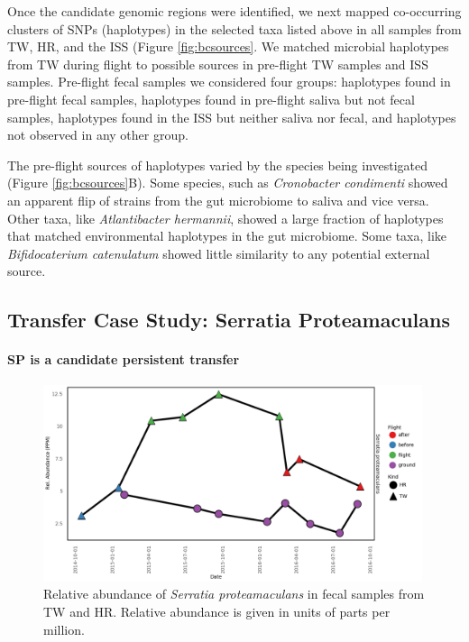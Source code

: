 Once the candidate genomic regions were identified, we next mapped co-occurring clusters of SNPs (haplotypes) in the selected taxa listed above in all samples from TW, HR, and the ISS (Figure \ref{fig:bcsources}. We matched microbial haplotypes from TW during flight to possible sources in pre-flight TW samples and ISS samples. Pre-flight fecal samples we considered four groups: haplotypes found in pre-flight fecal samples, haplotypes found in pre-flight saliva but not fecal samples, haplotypes found in the ISS but neither saliva nor fecal, and haplotypes not observed in any other group. 

The pre-flight sources of haplotypes varied by the species being investigated (Figure \ref{fig:bcsources}B). Some species, such as \textit{Cronobacter condimenti} showed an apparent flip of strains from the gut microbiome to saliva and vice versa. Other taxa, like \textit{Atlantibacter hermannii}, showed a large fraction of haplotypes that matched environmental haplotypes in the gut microbiome. Some taxa, like \textit{Bifidocaterium catenulatum} showed little similarity to any potential external source.



\subsection{Transfer Case Study: Serratia Proteamaculans}

\paragraph{SP is a candidate persistent transfer}

\begin{figure}
  \begin{center}
    \includegraphics[width=0.99\textwidth]{figs/sp_abundance.png}
	\caption{\small{
	    Relative abundance of \textit{Serratia proteamaculans} in fecal samples from TW and HR. Relative abundance is given in units of parts per million.
	}}
    \label{fig:abundance}
  \end{center}
\end{figure}


